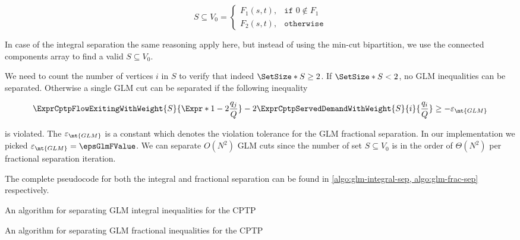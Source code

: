 \begin{equation}
	S \subseteq V_0 =
	\begin{cases}
		F_1(s, t), & \texttt{if } 0 \notin F_1 \\
		F_2(s, t), & \texttt{otherwise}
	\end{cases}
\end{equation}

In case of the integral separation the same reasoning apply here, but instead of using the min-cut bipartition, we use the connected components array to find a valid $S \subseteq V_0$.

We need to count the number of vertices $i$ in $S$ to verify that indeed $\SetSize*{S} \ge 2$.
If $\SetSize*{S} < 2$, no GLM inequalities can be separated.
Otherwise a single GLM cut can be separated if the following inequality

\begin{equation}
	\begin{split}
		\ExprCptpFlowExitingWithWeight{S}{\Expr*{1 - 2 \frac{q_j}{Q}}} - 2 	\ExprCptpServedDemandWithWeight{S}{i}{\frac{q_i}{Q}} \ge - \varepsilon_{\mt{GLM}}
	\end{split}
\end{equation}

is violated.
The $\varepsilon_{\mt{GLM}}$ is a constant which denotes the violation tolerance for the GLM fractional separation.
In our implementation we picked $\varepsilon_{\mt{GLM}} = \epsGlmFValue$.
We can separate $O(N^2)$ GLM cuts since the number of set $S \subseteq V_0$ is in the order of $\Theta(N^2)$ per fractional separation iteration.

The complete pseudocode for both the integral and fractional separation can be found in \cref{algo:glm-integral-sep, algo:glm-frac-sep} respectively.

\begin{algorithm}
	\caption{An algorithm for separating GLM integral inequalities for the CPTP}
	\label{algo:glm-integral-sep}
	
\end{algorithm}

\begin{algorithm}
	\caption{An algorithm for separating GLM fractional inequalities for the CPTP}
	\label{algo:glm-frac-sep}
	
\end{algorithm}
